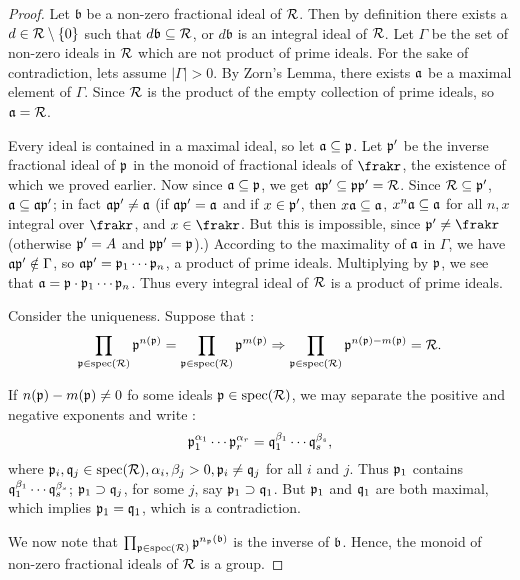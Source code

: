 \begin{proof}
  Let $\mathfrak{b}$ be a non-zero fractional ideal of $\mathcal{R}$. Then by definition there exists a $d\in \mathcal{R}\setminus \{0\}$ such that $d\mathfrak{b}\subseteq \mathcal{R}$, or $d\mathfrak{b}$ is an integral ideal of $\mathcal{R}$. Let $\Gamma$ be the set of non-zero ideals in $\mathcal{R}$ which are not product of prime ideals. For the sake of contradiction, lets assume $|\Gamma|>0$. By Zorn's Lemma, there exists $\mathfrak{a}$ be a maximal element of $\Gamma$. Since $\mathcal{R}$ is the product of the empty collection of prime ideals, so $\mathfrak{a} = \mathcal{R}$.

   Every ideal is contained in a maximal ideal, so let $\mathfrak{a} \subseteq \mathfrak{p}$. Let $\mathfrak{p}'$ be the inverse fractional ideal of $\mathfrak{p}$ in the monoid of fractional ideals of $\frakr$, the existence of which we proved earlier. Now since $\mathfrak{a} \subseteq \mathfrak{p}$, we get $\mathfrak{a}\mathfrak{p}' \subseteq \mathfrak{p}\mathfrak{p}' = \mathcal{R}$. Since $\mathcal{R} \subseteq \mathfrak{p}'$, $\mathfrak{a} \subseteq \mathfrak{a}\mathfrak{p}'$; in fact $\mathfrak{a}\mathfrak{p}'  \neq \mathfrak{a}$ (if
    $\mathfrak{a}\mathfrak{p}' = \mathfrak{a}$ and if $x\in \mathfrak{p}'$, then $x\mathfrak{a} \subseteq \mathfrak{a}$, $x^n\mathfrak{a}\subseteq \mathfrak{a}$ for all $n,x$ integral over $\frakr$, and $x\in \frakr$. But this is impossible, since $\frakp' \neq \frakr$ (otherwise $\mathfrak{p}' = A$ and $\mathfrak{p}\mathfrak{p}'=\mathfrak{p}$).) According to the maximality of $\mathfrak{a}$ in $\Gamma$, we have
     $\mathfrak{a}\mathfrak{p}'\notin \Gamma$, so $\mathfrak{a}\mathfrak{p}' = \mathfrak{p}_1\cdots\mathfrak{p}_n$,  a product of prime ideals. Multiplying by $\mathfrak{p}$, we see that $\mathfrak{a} = \mathfrak{p}\cdot\mathfrak{p}_1\cdots \mathfrak{p}_n$. Thus every integral ideal of $\mathcal{R}$ is a product of prime ideals.


  Consider the uniqueness. Suppose that :
  \[\prod_{\mathfrak{p} \in \operatorname{spec}(\mathcal{R})} \mathfrak{p}^{n(\mathfrak{p})} = \prod_{\mathfrak{p} \in \operatorname{spec}(\mathcal{R})} \mathfrak{p}^{m(\mathfrak{p})} \Rightarrow \prod_{\mathfrak{p} \in \operatorname{spec}(\mathcal{R})} \mathfrak{p}^{n(\mathfrak{p})- m(\mathfrak{p})} = \mathcal{R}.\]

  If $n(\mathfrak{p})-m(\mathfrak{p})\neq 0$ fo some ideals $\mathfrak{p} \in \operatorname{spec}(\mathcal{R})$, we may separate the positive and negative exponents and write :
  \[\mathfrak{p}_1^{\alpha_1}\cdots \mathfrak{p}_r^{\alpha_r}= \mathfrak{q}_1^{\beta_1}\cdots\mathfrak{q}_s^{\beta_s},\]
  where $\mathfrak{p}_i, \mathfrak{q}_j\in \operatorname{spec}(\mathcal{R}), \alpha_i, \beta_j >0, \mathfrak{p}_i \neq \mathfrak{q}_j$ for all $i$ and $j$. Thus $\mathfrak{p}_1$ contains $ \mathfrak{q}_1^{\beta_1}\cdots\mathfrak{q}_s^{\beta_s}$; $\mathfrak{p}_1 \supset \mathfrak{q}_j$,
   for some $j$, say $\mathfrak{p}_1 \supset \mathfrak{q}_1$. But $\mathfrak{p}_1$ and $\mathfrak{q}_1$ are both maximal, which implies $\mathfrak{p}_1=\mathfrak{q}_1$, which is a contradiction.

   We now note that $\prod_{\mathfrak{p} \in \operatorname{spec}(\mathcal{R})}\mathfrak{p}^{n_{\mathfrak{p}}(\mathfrak{b})}$ is the inverse of $\mathfrak{b}$. Hence, the monoid of non-zero fractional ideals of $\mathcal{R}$ is a group.
\end{proof}

